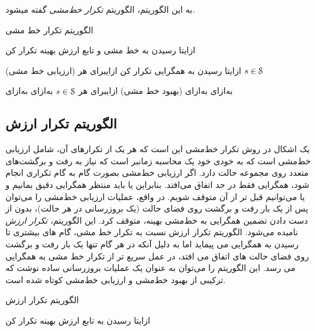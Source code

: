 به این الگوریتم، الگوریتم \textit{تکرار خط‌مشی}  
گفته می\nf شود.

{الگوریتم تکرار خط مشی}

‌ازای{تا رسیدن به خط مشی و تابع ارزش بهینه تکرار کن}

(ارزیابی خط مشی)
‌ازای{تا رسیدن به همگرایی تکرار کن}
‌ازای{برای هر $s \in \EuScript{S}$}

‌به‌ازای
‌به‌ازای
(بهبود خط مشی)
‌ازای{برای هر $s \in \EuScript{S}$}
‌به‌ازای
‌به‌ازای


\subsection{الگوریتم تکرار ارزش}
یک اشکال در روش تکرار خط‌مشی این است که هر یک از تکرارهای آن، شامل ارزیابی خط‌مشی است که
به خودی خود یک محاسبه زمان\nf بر است که نیاز به رفت و برگشت‌های متعدد روی مجموعه حالت دارد. اگر
ارزیابی خط‌مشی بصورت گام به گام تکراری انجام شود، همگرایی فقط در حد اتفاق می‌افتد. بنابراین یا باید منتظر همگرایی دقیق بمانیم و یا می‌توانیم قبل تر از آن متوقف شویم. 
در واقع، عملیات ارزیابی خط‌مشی را می‌توان پس از یک بار رفت و برگشت روی فضای حالت (یک بروزرسانی در هر حالت)،  بدون از دست دادن تضمین همگرایی به خط‌مشی بهینه، متوقف کرد. 
این الگوریتم،
\textit{تکرار ارزش}
 نامیده می‌شود. الگوریتم تکرار ارزش نسبت به تکرار خط مشی، گام های بیشتری تا رسیدن به همگرایی می پیماید اما به دلیل آنکه در هر گام تنها یک بار رفت و برگشت روی فضای حالت های اتفاق می افتد، در عمل سریع تر از تکرار خط مشی به همگرایی می رسد. این الگوریتم
را می‌توان به عنوان یک عملیات بروزرسانی ساده نوشت که ترکیبی از بهبود خط‌مشی و ارزیابی خط‌مشی کوتاه شده است.



{الگوریتم تکرار ارزش}

‌ازای{تا رسیدن به تابع ارزش بهینه تکرار کن}


